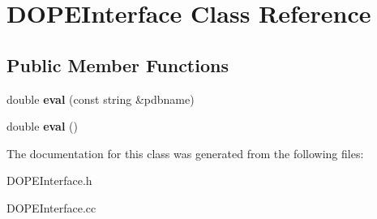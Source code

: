 \hypertarget{classDOPEInterface}{\section{D\-O\-P\-E\-Interface Class Reference}
\label{classDOPEInterface}
}
\subsection*{Public Member Functions}
\begin{DoxyCompactItemize}
\item 
\hypertarget{classDOPEInterface_a9bb3e223e55a95901477c79df558b05b}{double {\bfseries eval} (const string \&pdbname)}\label{classDOPEInterface_a9bb3e223e55a95901477c79df558b05b}

\item 
\hypertarget{classDOPEInterface_a7bf0af0229d70a2019ca9d4b7263c4de}{double {\bfseries eval} ()}\label{classDOPEInterface_a7bf0af0229d70a2019ca9d4b7263c4de}

\end{DoxyCompactItemize}


The documentation for this class was generated from the following files\-:\begin{DoxyCompactItemize}
\item 
D\-O\-P\-E\-Interface.\-h\item 
D\-O\-P\-E\-Interface.\-cc\end{DoxyCompactItemize}
